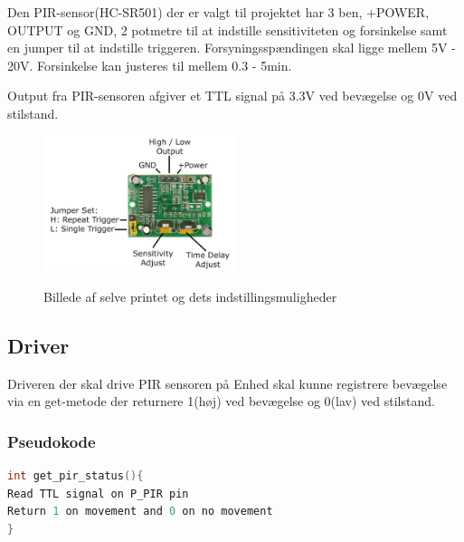 Den PIR-sensor(HC-SR501) der er valgt til projektet har 3 ben, +POWER, OUTPUT og GND, 2 potmetre til at indstille sensitiviteten og forsinkelse samt en jumper til at indstille triggeren. Forsyningsspændingen skal ligge mellem 5V - 20V. Forsinkelse kan justeres til mellem 0.3 - 5min.

Output fra PIR-sensoren afgiver et TTL signal på 3.3V ved bevægelse og 0V ved stilstand.

\begin{figure}[H] \centering
{\includegraphics[width=0.5\textwidth]{filer/design/Billeder/pir_overview}}
\caption{Billede af selve printet og dets indstillingsmuligheder}
\label{lab:pir_overview}
\raggedright
\end{figure}

\subsection*{Driver}

Driveren der skal drive PIR sensoren på Enhed skal kunne registrere bevægelse via en get-metode der returnere 1(høj) ved bevægelse og 0(lav) ved stilstand.

\subsubsection*{Pseudokode}

\begin{lstlisting}[language=C]
int get_pir_status(){
Read TTL signal on P_PIR pin
Return 1 on movement and 0 on no movement
}
\end{lstlisting}